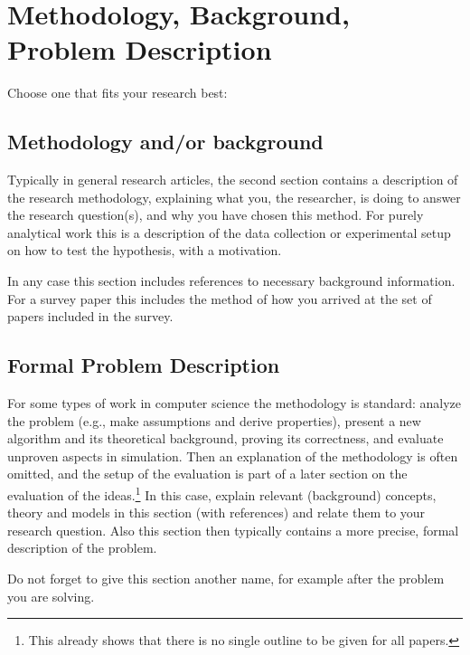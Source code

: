 \section{Methodology, Background, Problem Description}
Choose one that fits your research best:
\subsection{Methodology and/or background}
Typically in general research articles, the second section contains a description of the research methodology, explaining what you, the researcher, is doing to answer the research question(s), and why you have chosen this method.
For purely analytical work this is a description of the data collection or experimental setup on how to test the hypothesis, with a motivation.

In any case this section includes references to necessary background information.
For a survey paper this includes the method of how you arrived at the set of papers included in the survey.

\subsection{Formal Problem Description}
For some types of work in computer science the methodology is standard: analyze the problem (e.g., make assumptions and derive properties), present a new algorithm and its theoretical background, proving its correctness, and evaluate unproven aspects in simulation.
Then an explanation of the methodology is often omitted, and the setup of the evaluation is part of a later section on the evaluation of the ideas.\footnote{This already shows that there is no single outline to be given for all papers.}
In this case, explain relevant (background) concepts, theory and models in this section (with references) and relate them to your research question.
Also this section then typically contains a more precise, formal description of the problem.

Do not forget to give this section another name, for example after the problem you are solving.
